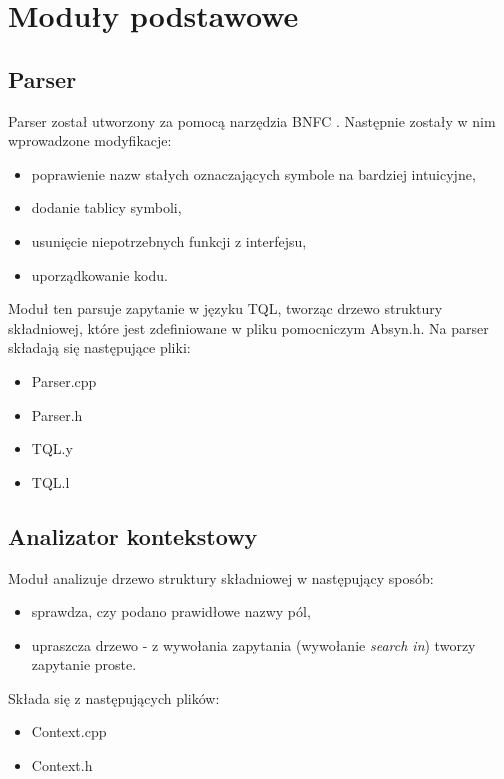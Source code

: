 \chapter{Moduły podstawowe}

\section{Parser}
Parser został utworzony za pomocą narzędzia BNFC \cite{bnfc}. Następnie zostały w nim wprowadzone modyfikacje:
\begin{itemize}
\item poprawienie nazw stałych oznaczających symbole na bardziej intuicyjne,
\item dodanie tablicy symboli,
\item usunięcie niepotrzebnych funkcji z interfejsu,
\item uporządkowanie kodu.
\end{itemize}
Moduł ten parsuje zapytanie w języku TQL, tworząc drzewo struktury składniowej, które jest zdefiniowane w pliku pomocniczym Absyn.h.
Na parser składają się następujące pliki:
\begin{itemize}
 \item Parser.cpp
 \item Parser.h
 \item TQL.y %
 \item TQL.l %
\end{itemize}

\section{Analizator kontekstowy}
Moduł analizuje drzewo struktury składniowej w następujący sposób:
\begin{itemize}
 \item sprawdza, czy podano prawidłowe nazwy pól,  %
\item upraszcza drzewo - z wywołania zapytania (wywołanie \textit{search in}) tworzy zapytanie proste.
\end{itemize}
Składa się z następujących plików:
\begin{itemize}
 \item Context.cpp
 \item Context.h
\end{itemize}

